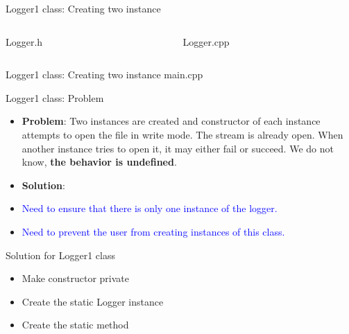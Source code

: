 \documentclass[13pt]{beamer}
\begin{document}
\begin{frame}{Logger1 class: Creating two instance}
\begin{columns}[T]
\begin{column}{.45\textwidth}
\lstset{basicstyle=\tiny,style=myCustomCppStyle}
Logger.h

\end{column}

\begin{column}{.45\textwidth}
\lstset{basicstyle=\tiny,style=myCustomCppStyle}
Logger.cpp

\end{column}
\end{columns}
\end{frame}

\begin{frame}{Logger1 class: Creating two instance}
main.cpp
\lstset{basicstyle=\tiny,style=myCustomCppStyle}

\end{frame}

\begin{frame}{Logger1 class: Problem}
\begin{itemize}
\setlength\itemsep{1em}

\item \textbf{Problem}: Two instances are created and constructor of each instance attempts to open the file in write mode. The stream is already open. When another instance tries to open it, it may either fail or succeed. We do not know, \textbf{the behavior is undefined}.

\item \textbf{Solution}:

\item \textcolor{blue}{Need to ensure that there is only one instance of the logger.}

\item \textcolor{blue}{Need to prevent the user from creating instances of this class.}
\end{itemize}
\end{frame}

\begin{frame}{Solution for Logger1 class}
\begin{itemize}
\setlength\itemsep{2em}
\item Make constructor private

\item Create the static Logger instance

\item Create the static method
\end{itemize}
\end{frame}
\end{document}
